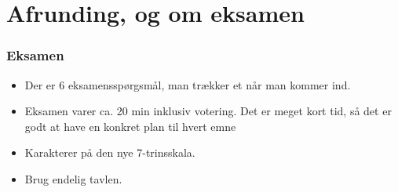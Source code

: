 \documentclass{beamer}
\begin{document}
\section{Afrunding, og om eksamen}
\begin{frame}
\frametitle{Eksamen}
\begin{itemize}
\item Der er 6 eksamensspørgsmål, man trækker et når man kommer ind.
\item Eksamen varer ca. 20 min inklusiv votering. Det er meget kort
  tid, så det er godt at have en konkret plan til hvert emne
\item Karakterer på den nye 7-trinsskala.
\item Brug endelig tavlen.
\end{itemize}
\end{frame}
\end{document}
